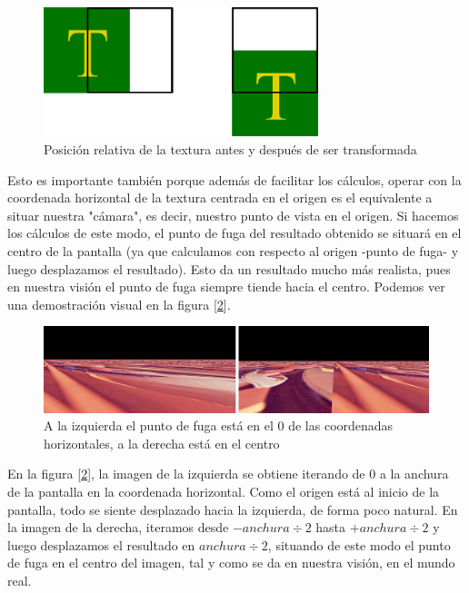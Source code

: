\begin{figure}[h]
	\centering
	\includegraphics[width=8cm]{archivos/desplazamiento}
	\caption{Posición relativa de la textura antes y después de ser transformada}
	\label{fig:desplazamiento}
\end{figure}

Esto es importante también porque además de facilitar los cálculos, operar con la coordenada horizontal de la textura centrada en el origen es el equivalente a situar nuestra "cámara", es decir, nuestro punto de vista en el origen. Si hacemos los cálculos de este modo, el punto de fuga del resultado obtenido se situará en el centro de la pantalla (ya que calculamos con respecto al origen -punto de fuga- y luego desplazamos el resultado). Esto da un resultado mucho más realista, pues en nuestra visión el punto de fuga siempre tiende hacia el centro. Podemos ver una demostración visual en la figura [\ref{fig:planes1}].\\

\begin{figure}[h]
	\centering
	\includegraphics[width=14cm]{archivos/planes1}
	\caption{A la izquierda el punto de fuga está en el 0 de las coordenadas horizontales, a la derecha está en el centro}
	\label{fig:planes1}
\end{figure}

En la figura [\ref{fig:planes1}], la imagen de la izquierda se obtiene iterando de 0 a la anchura de la pantalla en la coordenada horizontal. Como el origen está al inicio de la pantalla, todo se siente desplazado hacia la izquierda, de forma poco natural. En la imagen de la derecha, iteramos desde \(-anchura \div 2\) hasta  \(+anchura \div 2\) y luego desplazamos el resultado en \(anchura \div 2\), situando de este modo el punto de fuga en el centro del imagen, tal y como se da en nuestra visión, en el mundo real.\\

